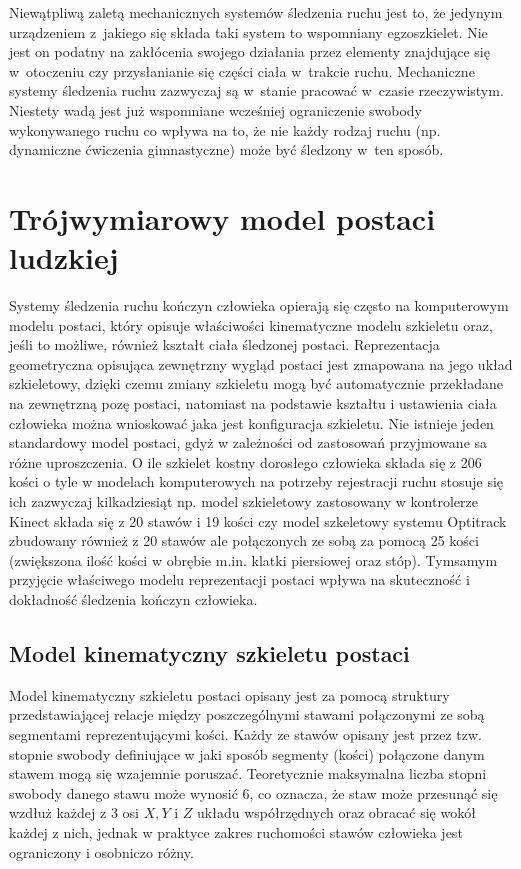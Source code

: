 Niewątpliwą zaletą mechanicznych systemów śledzenia ruchu jest to, że jedynym urządzeniem z~jakiego się składa taki system to wspomniany egzoszkielet. Nie jest on podatny na zakłócenia swojego działania przez elementy znajdujące się w~otoczeniu czy przysłanianie się części ciała w~trakcie ruchu. Mechaniczne systemy śledzenia ruchu zazwyczaj są w~stanie pracować w~czasie rzeczywistym. Niestety wadą jest już wspomniane wcześniej ograniczenie swobody wykonywanego ruchu co wpływa na to, że nie każdy rodzaj ruchu (np. dynamiczne ćwiczenia gimnastyczne) może być śledzony w~ten sposób.

\section{Trójwymiarowy model postaci ludzkiej} \label{chap:bodyRep}
Systemy śledzenia ruchu kończyn człowieka opierają się często na komputerowym modelu postaci, który opisuje właściwości kinematyczne modelu szkieletu oraz, jeśli to możliwe, również kształt ciała śledzonej postaci. Reprezentacja geometryczna opisująca zewnętrzny wygląd postaci jest zmapowana na jego układ szkieletowy, dzięki czemu zmiany szkieletu mogą być automatycznie przekładane na zewnętrzną pozę postaci, natomiast na podstawie kształtu i ustawienia ciała człowieka można wnioskować jaka jest konfiguracja szkieletu. 
Nie istnieje jeden standardowy model postaci, gdyż w zależności od zastosowań przyjmowane sa różne uproszczenia. O ile szkielet kostny dorosłego człowieka składa się z 206 kości\cite{Łasiński1990} o tyle w modelach komputerowych na potrzeby rejestracji ruchu stosuje się ich zazwyczaj kilkadziesiąt np. model szkieletowy zastosowany w kontrolerze Kinect składa się z 20 stawów i 19 kości\cite{msdn:kinectSkeleton} czy model szkeletowy systemu Optitrack zbudowany również z 20 stawów ale połączonych ze sobą za pomocą 25 kości\cite{optitrackSkeleton} (zwiększona ilość kości w obrębie m.in. klatki piersiowej oraz stóp). Tymsamym przyjęcie właściwego modelu reprezentacji postaci wpływa na skuteczność i dokładność śledzenia kończyn człowieka.

\subsection{Model kinematyczny szkieletu postaci}
Model kinematyczny szkieletu postaci opisany jest za pomocą struktury przedstawiającej relacje między poszczególnymi stawami połączonymi ze sobą segmentami reprezentującymi kości. Każdy ze stawów opisany jest przez tzw. stopnie swobody definiujące w jaki sposób segmenty (kości) połączone danym stawem mogą się wzajemnie poruszać. Teoretycznie maksymalna liczba stopni swobody danego stawu może wynosić 6, co oznacza, że staw może przesunąć się wzdłuż każdej z 3 osi $X, Y$ i $Z$ układu współrzędnych oraz obracać się wokół każdej z nich, jednak w praktyce zakres ruchomości stawów człowieka jest ograniczony i osobniczo różny.\\

